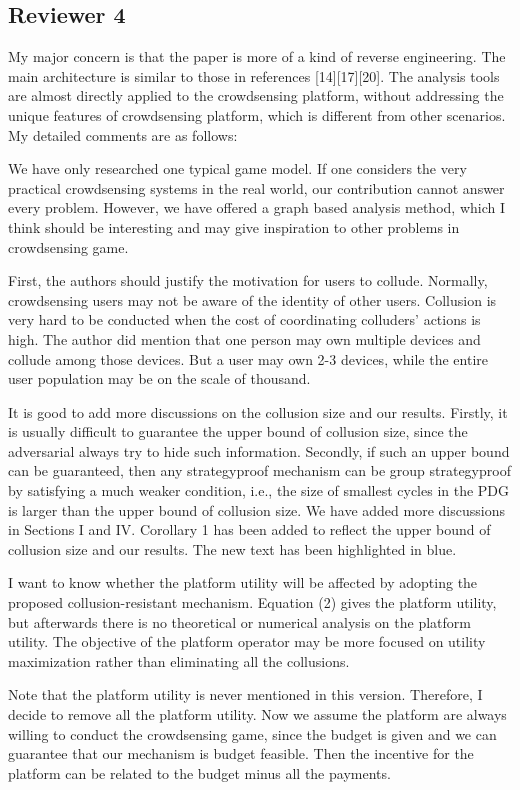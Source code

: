 \documentclass[a4paper,11pt]{exam}
\begin{document}
\begin{questions}
\section{Reviewer 4}
\question My major concern is that the paper is more of a kind of reverse engineering. The main architecture is similar to those in references [14][17][20]. The analysis tools are almost directly applied to the crowdsensing platform, without addressing the unique features of crowdsensing platform, which is different from other scenarios. My detailed comments are as follows:
\begin{solution}
We have only researched one typical game model. If one considers the very practical crowdsensing systems in the real world, our contribution cannot answer every problem. However, we have offered a graph based analysis method, which I think should be interesting and may give inspiration to other problems in crowdsensing game.
\end{solution}

\question First, the authors should justify the motivation for users to collude. Normally, crowdsensing users may not be aware of the identity of other users. Collusion is very hard to be conducted when the cost of coordinating colluders’ actions is high. The author did mention that one person may own multiple devices and collude among those devices. But a user may own 2-3 devices, while the entire user population may be on the scale of thousand. 
\begin{solution}
It is good to add more discussions on the collusion size and our results. Firstly, it is usually difficult to guarantee the upper bound of collusion size, since the adversarial always try to hide such information. Secondly, if such an upper bound can be guaranteed, then any strategyproof mechanism can be group strategyproof by satisfying a much weaker condition, i.e., the size of smallest cycles in the PDG is larger than the upper bound of collusion size. 
We have added more discussions in Sections I and IV. Corollary 1 has been added to reflect the upper bound of collusion size and our results. The new text has been highlighted in blue.
\end{solution}

\question I want to know whether the platform utility will be affected by adopting the proposed collusion-resistant mechanism. Equation (2) gives the platform utility, but afterwards there is no theoretical or numerical analysis on the platform utility. The objective of the platform operator may be more focused on utility maximization rather than eliminating all the collusions.
\begin{solution}
Note that the platform utility is never mentioned in this version. Therefore, I decide to remove all the platform utility. Now we assume the platform are always willing to conduct the crowdsensing game, since the budget is given and we can guarantee that our mechanism is budget feasible. Then the incentive for the platform can be related to the budget minus all the payments.
\end{solution}


\end{questions}
\end{document}
